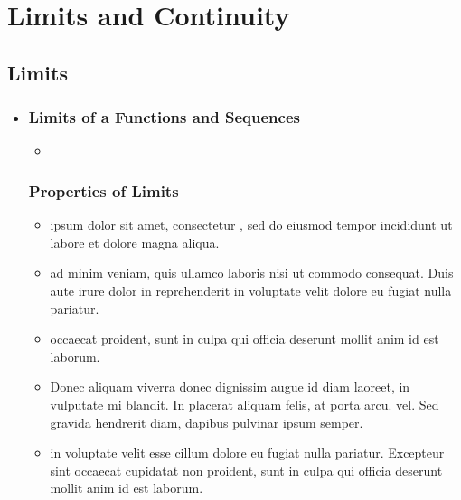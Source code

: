 \chapter{Limits and Continuity}

\section{Limits}
\begin{itemize}
  \item []

  \subsection{Limits of a Functions and Sequences}
  \begin{itemize}
    \item
  \end{itemize}


  \subsection{Properties of Limits}
  \begin{itemize}
    \item {} ipsum dolor sit amet, consectetur , sed do eiusmod tempor incididunt ut labore et dolore magna aliqua.
    \item {} ad minim veniam, quis  ullamco
      laboris nisi ut  commodo consequat. Duis aute irure
      dolor in reprehenderit in voluptate velit  dolore eu fugiat nulla pariatur.
    \item {} occaecat  proident, sunt in culpa qui officia deserunt mollit anim id est laborum.
    \item Donec aliquam viverra  donec dignissim
      augue id diam laoreet, in vulputate mi blandit. In placerat aliquam felis,
      at porta arcu. 
      vel. Sed gravida hendrerit diam, dapibus pulvinar ipsum semper.
    \item {} in voluptate velit esse cillum dolore eu fugiat nulla pariatur. Excepteur sint occaecat cupidatat non proident, sunt in culpa qui officia deserunt mollit anim id est laborum.
  \end{itemize}


\end{itemize}
